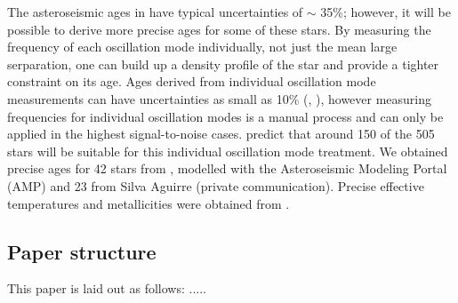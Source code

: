 \documentclass[10pt,preprint]{aastex}
\begin{document}
The asteroseismic ages in \citet{Chaplin2013} have typical uncertainties of $\sim$ 35\%; however, it will be possible to derive more precise ages for some of these stars.
By measuring the frequency of each oscillation mode individually, not just the mean large serparation, one can build up a density profile of the star and provide a tighter constraint on its age.
Ages derived from individual oscillation mode measurements can have uncertainties as small as 10\% (\citet{Brown1994}, \citet{SilvaAguirre2013}), however measuring frequencies for individual oscillation modes is a manual process and can only be applied in the highest signal-to-noise cases.
\citet{Chaplin2013} predict that around 150 of the 505 stars will be suitable for this individual oscillation mode treatment.
We obtained precise ages for 42 stars from \citet{Metcalfe2014}, modelled with the Asteroseismic Modeling Portal (AMP) and 23 from Silva Aguirre (private communication).
Precise effective temperatures and metallicities were obtained from \citet{Bruntt2012}.


\subsection{Paper structure}

This paper is laid out as follows: .....



\end{document}
